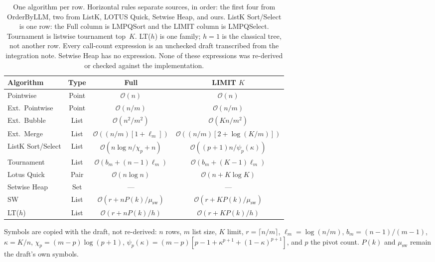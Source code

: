 \begin{table}[t]
\centering
\caption{One algorithm per row.
Horizontal rules separate sources, in order: the first four from OrderByLLM, two from ListK, LOTUS Quick, Setwise Heap, and ours.
ListK Sort/Select is one row: the Full column is LMPQSort and the LIMIT column is LMPQSelect.
Tournament is listwise tournament top~$K$.
LT($h$) is one family; $h{=}1$ is the classical tree, not another row.
Every call-count expression is an unchecked draft transcribed from the integration note.
Setwise Heap has no expression.
None of these expressions was re-derived or checked against the implementation.}
\label{tab:ranking-algorithms}
\footnotesize
\setlength{\tabcolsep}{2.2pt}
\renewcommand{\arraystretch}{1.08}
\begin{tabular*}{\columnwidth}{@{\extracolsep{\fill}}lccc@{}}
\toprule
\textbf{Algorithm} & \textbf{Type} & \textbf{Full} & \textbf{LIMIT $K$} \\
\midrule
Pointwise & Point & $\mathcal{O}(n)$ & $\mathcal{O}(n)$ \\
Ext.\ Pointwise & Point & $\mathcal{O}(n/m)$ & $\mathcal{O}(n/m)$ \\
Ext.\ Bubble & List & $\mathcal{O}(n^{2}/m^{2})$ & $\mathcal{O}(Kn/m^{2})$ \\
Ext.\ Merge & List & $\mathcal{O}((n/m)[1{+}\ell_m])$ & $\mathcal{O}((n/m)[2{+}\log(K/m)])$ \\
\midrule
ListK Sort/Select & List & $\mathcal{O}(n\log n/\chi_p{+}n)$ & $\mathcal{O}((p{+}1)n/\psi_p(\kappa))$ \\
Tournament & List & $\mathcal{O}(b_m{+}(n{-}1)\ell_m)$ & $\mathcal{O}(b_m{+}(K{-}1)\ell_m)$ \\
\midrule
Lotus Quick & Pair & $\mathcal{O}(n\log n)$ & $\mathcal{O}(n{+}K\log K)$ \\
\midrule
Setwise Heap & Set & --- & --- \\
\midrule
SW & List & $\mathcal{O}(r{+}nP(k)/\mu_{\mathrm{sw}})$ & $\mathcal{O}(r{+}KP(k)/\mu_{\mathrm{sw}})$ \\
LT($h$) & List & $\mathcal{O}(r{+}nP(k)/h)$ & $\mathcal{O}(r{+}KP(k)/h)$ \\
\bottomrule
\end{tabular*}
\vspace{0.35em}

{\footnotesize
Symbols are copied with the draft, not re-derived:
$n$ rows, $m$ list size, $K$ limit, $r{=}\lceil n/m\rceil$,
$\ell_m{=}\log(n/m)$, $b_m{=}(n{-}1)/(m{-}1)$,
$\kappa{=}K/n$, $\chi_p{=}(m{-}p)\log(p{+}1)$,
$\psi_p(\kappa){=}(m{-}p)[p{-}1{+}\kappa^{p+1}{+}(1{-}\kappa)^{p+1}]$,
and $p$ the pivot count.
$P(k)$ and $\mu_{\mathrm{sw}}$ remain the draft's own symbols.\par}
\end{table}
